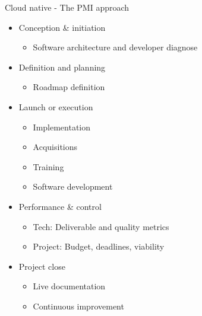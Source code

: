 \documentclass[aspectratio=169]{beamer}
\begin{document}
\begin{frame}{Cloud native - The PMI approach}

	\begin{itemize}
    		\item Conception \& initiation
            	\begin{itemize}
                		\item Software architecture and developer diagnose
                	\end{itemize}
    		\item Definition and planning
            	\begin{itemize}
                		\item Roadmap definition
                	\end{itemize}
            \item Launch or execution
            	\begin{itemize}
                		\item Implementation
                		\item Acquisitions 
                        \item Training
                        \item Software development
                	\end{itemize}
            \item Performance \& control
            	\begin{itemize}
                		\item Tech: Deliverable and quality metrics
                        \item Project: Budget, deadlines, viability
                	\end{itemize}
    		\item Project close
\begin{itemize}
                		\item Live documentation
                        \item Continuous improvement
                	\end{itemize}
    	\end{itemize}

\end{frame}
\end{document}
